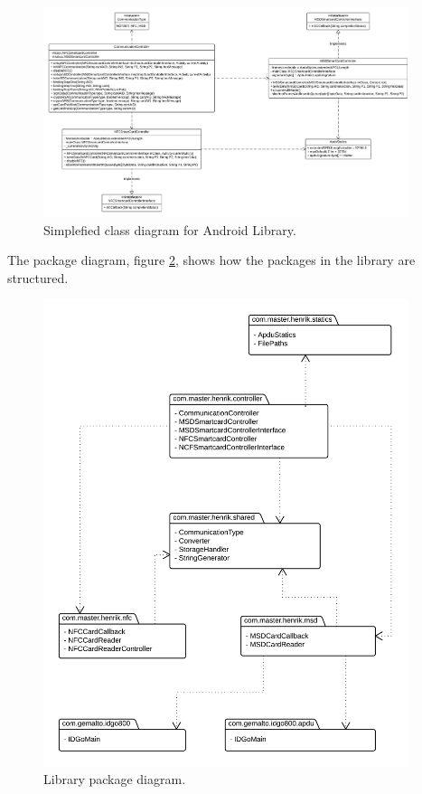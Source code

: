 \begin{figure}[h!]
  \caption{Simplefied class diagram for Android Library.}
  \label{fig:classdiagram_simple}
  \centering
    \includegraphics[width=0.95\textwidth]{images/Class_Diagram.png}
\end{figure}
The package diagram, figure \ref{fig:package}, shows how  the packages in the library are structured.

\begin{figure}[h!]
  \caption{Library package diagram.}
  \label{fig:package}
  \centering
    \includegraphics[width=0.95\textwidth]{images/package2.png}
\end{figure}
